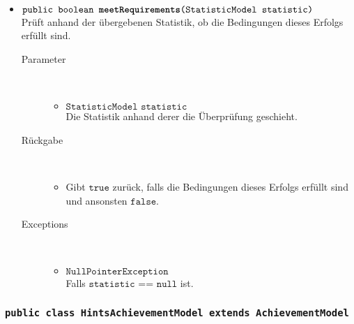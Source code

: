 \begin{description}
\begin{itemize}
		\item $\texttt{public boolean \textbf{meetRequirements}(StatisticModel statistic)}$ \\ Prüft anhand der übergebenen Statistik, ob die Bedingungen dieses Erfolgs erfüllt sind.
		\begin{description}
		\item[Parameter] \hfill \\
			\vspace{-.8cm}
			\begin{itemize}
				\item $\texttt{StatisticModel statistic}$ \\ Die Statistik anhand derer die Überprüfung geschieht. 
			\end{itemize}
			\item[Rückgabe] \hfill \\
			\vspace{-.8cm}
			\begin{itemize}
				\item Gibt $\texttt{true}$ zurück, falls die Bedingungen dieses Erfolgs erfüllt sind und ansonsten $\texttt{false}$.
			\end{itemize}
			\item[Exceptions] \hfill \\
			\vspace{-.8cm}
			\begin{itemize}
				\item $\texttt{NullPointerException}$ \\ Falls $\texttt{statistic == null}$ ist.
			\end{itemize}
		\end{description}
		
	\end{itemize}
\end{description}

\subsubsection{\normalfont \texttt{public class \textbf{HintsAchievementModel} extends AchievementModel}}

